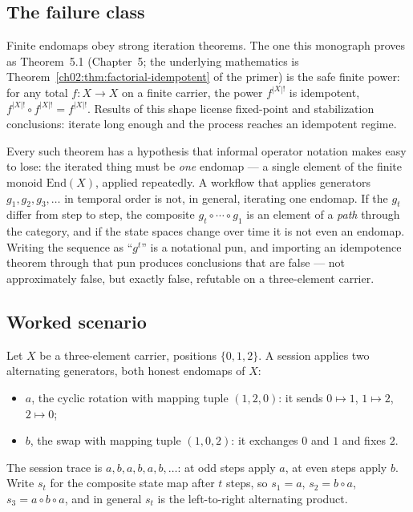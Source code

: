 \subsection{The failure class}

Finite endomaps obey strong iteration theorems. The one this monograph
proves as Theorem~5.1 (Chapter~5; the underlying mathematics is
Theorem~\ref{ch02:thm:factorial-idempotent} of the primer) is the safe
finite power: for any total $f : X \to X$ on a finite carrier, the power
$f^{|X|!}$ is idempotent, $f^{|X|!} \circ f^{|X|!} = f^{|X|!}$. Results of
this shape license fixed-point and stabilization conclusions: iterate long
enough and the process reaches an idempotent regime.

Every such theorem has a hypothesis that informal operator notation makes
easy to lose: the iterated thing must be \emph{one} endomap --- a single
element of the finite monoid $\mathrm{End}(X)$, applied repeatedly. A
workflow that applies generators $g_1, g_2, g_3, \dots$ in temporal order is
not, in general, iterating one endomap. If the $g_t$ differ from step to
step, the composite $g_t \circ \cdots \circ g_1$ is an element of a
\emph{path} through the category, and if the state spaces change over time it
is not even an endomap. Writing the sequence as ``$g^t$'' is a notational
pun, and importing an idempotence theorem through that pun produces
conclusions that are false --- not approximately false, but exactly false,
refutable on a three-element carrier.

\subsection{Worked scenario}\label{ch01:sec:power-scenario}

Let $X$ be a three-element carrier, positions $\{0, 1, 2\}$. A session
applies two alternating generators, both honest endomaps of $X$:

\begin{itemize}
\item $a$, the cyclic rotation with mapping tuple $(1, 2, 0)$: it sends
$0 \mapsto 1$, $1 \mapsto 2$, $2 \mapsto 0$;
\item $b$, the swap with mapping tuple $(1, 0, 2)$: it exchanges $0$ and
$1$ and fixes $2$.
\end{itemize}

The session trace is $a, b, a, b, a, b, \dots$: at odd steps apply $a$, at
even steps apply $b$. Write $s_t$ for the composite state map after $t$
steps, so $s_1 = a$, $s_2 = b \circ a$, $s_3 = a \circ b \circ a$, and in
general $s_t$ is the left-to-right alternating product.

